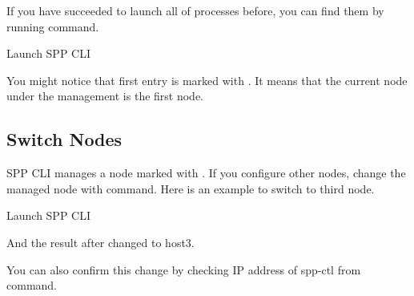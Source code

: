 \documentclass[a4paper,11pt,openany,oneside,english]{sphinxmanual}
\begin{document}
If you have succeeded to launch all of  processes before,
you can find them by running  command.

\begin{sphinxVerbatim}[commandchars=\\\{\},formatcom=\footnotesize]
 Launch SPP CLI
\end{sphinxVerbatim}

You might notice that first entry is marked with \sphinxcode{\sphinxupquote{*}}. It means that
the current node under the management is the first node.


\subsection{Switch Nodes}
\label{\detokenize{usecases/multi_nodes:switch-nodes}}
SPP CLI manages a node marked with \sphinxcode{\sphinxupquote{*}}. If you configure other nodes,
change the managed node with  command.
Here is an example to switch to third node.

\begin{sphinxVerbatim}[commandchars=\\\{\},formatcom=\footnotesize]
 Launch SPP CLI
\end{sphinxVerbatim}

And the result after changed to host3.

\begin{sphinxVerbatim}[commandchars=\\\{\},formatcom=\footnotesize]
\end{sphinxVerbatim}

You can also confirm this change by checking IP address of spp-ctl from
 command.

\begin{sphinxVerbatim}[commandchars=\\\{\},formatcom=\footnotesize]
\end{sphinxVerbatim}
\end{document}
